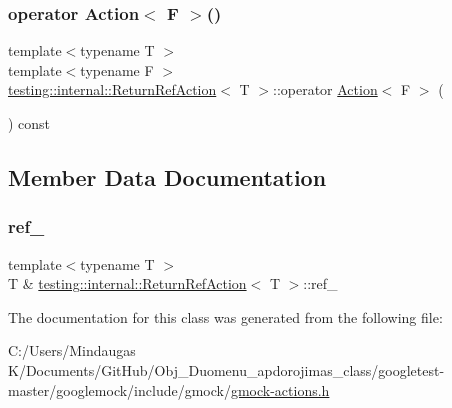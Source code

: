 \mbox{\label{classtesting_1_1internal_1_1_return_ref_action_a48e5d411097707e558af62eb68edc162}} 
\subsubsection{\texorpdfstring{operator Action$<$ F $>$()}{operator Action< F >()}\hspace{0.1cm}{\footnotesize\ttfamily [3/3]}}
{\footnotesize\ttfamily template$<$typename T $>$ \\
template$<$typename F $>$ \\
\mbox{\hyperlink{classtesting_1_1internal_1_1_return_ref_action}{testing\+::internal\+::\+Return\+Ref\+Action}}$<$ T $>$\+::operator \mbox{\hyperlink{classtesting_1_1_action}{Action}}$<$ F $>$ (\begin{DoxyParamCaption}{ }\end{DoxyParamCaption}) const\hspace{0.3cm}{\ttfamily [inline]}}



\subsection{Member Data Documentation}
\mbox{\label{classtesting_1_1internal_1_1_return_ref_action_ad07472e358d3315bb088254f925687c2}} 
\subsubsection{\texorpdfstring{ref\_}{ref\_}}
{\footnotesize\ttfamily template$<$typename T $>$ \\
T \& \mbox{\hyperlink{classtesting_1_1internal_1_1_return_ref_action}{testing\+::internal\+::\+Return\+Ref\+Action}}$<$ T $>$\+::ref\+\_\+\hspace{0.3cm}{\ttfamily [private]}}



The documentation for this class was generated from the following file\+:\begin{DoxyCompactItemize}
\item 
C\+:/\+Users/\+Mindaugas K/\+Documents/\+Git\+Hub/\+Obj\+\_\+\+Duomenu\+\_\+apdorojimas\+\_\+class/googletest-\/master/googlemock/include/gmock/\mbox{\hyperlink{googletest-master_2googlemock_2include_2gmock_2gmock-actions_8h}{gmock-\/actions.\+h}}\end{DoxyCompactItemize}
